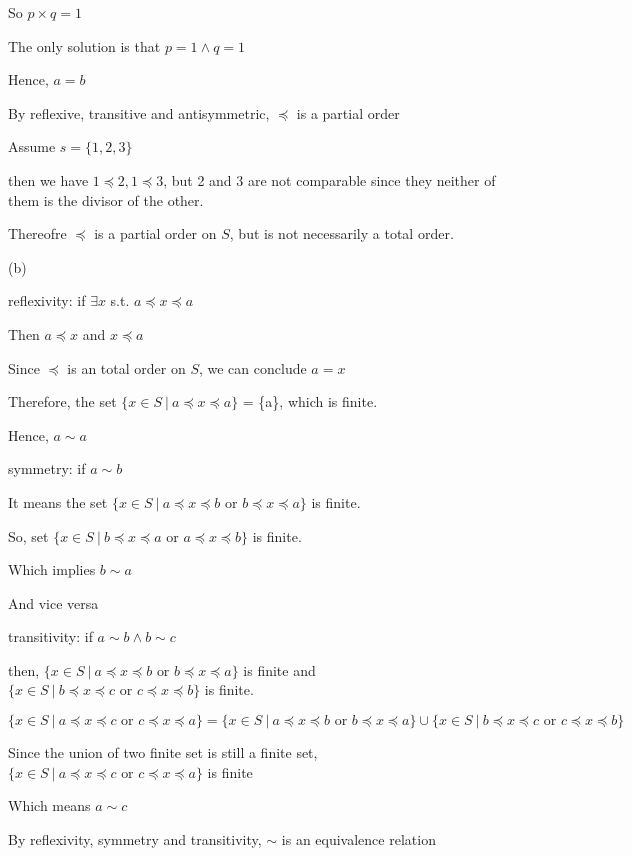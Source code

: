 \documentclass[11pt,twoside]{article}
\begin{document}
So $p\times q = 1$ 

The only solution is that $p=1 \land q = 1$ 

Hence, $a=b$

By reflexive, transitive and antisymmetric, $\preceq$ is a partial order

Assume $s = \{1,2,3\}$

then we have $1 \preceq 2, 1 \preceq 3$, but 2 and 3 are not comparable since they neither of them is the divisor of the other.


Thereofre $\preceq$ is a partial order on $S$, but is not necessarily a total order.

\hspace*{\fill}

(b)

reflexivity: if $\exists x$ s.t. $a\preceq x \preceq a$

Then $a\preceq x$ and $x\preceq a$

Since $\preceq$ is an total order on $S$, we can conclude $a= x$

Therefore, the set $\{x \in S\ |\ a \preceq x \preceq a\}$ = \{a\}, which is finite.

Hence, $a \sim a$

symmetry: if $a \sim b$

It means the set $\{x \in S\ |\ a \preceq x \preceq b \text{ or } b \preceq x \preceq a\}$ is finite.

So, set $\{x \in S\ |\ b \preceq x \preceq a \text{ or } a \preceq x \preceq b\}$ is finite.

Which implies $b \sim a$

And vice versa


transitivity: if $a\sim b \land b \sim c$

then, $\{x \in S\ |\ a \preceq x \preceq b \text{ or } b \preceq x \preceq a\}$ is finite and $\{x \in S\ |\ b \preceq x \preceq c \text{ or } c \preceq x \preceq b\}$ is finite.


$\{x \in S\ |\ a \preceq x \preceq c \text{ or } c \preceq x \preceq a\} = \{x \in S\ |\ a \preceq x \preceq b \text{ or } b \preceq x \preceq a\} \cup \{x \in S\ |\ b \preceq x \preceq c \text{ or } c \preceq x \preceq b\}$

Since the union of two finite set is still a finite set, $\{x \in S\ |\ a \preceq x \preceq c \text{ or } c \preceq x \preceq a\} $ is finite

Which means $a \sim c$

By reflexivity, symmetry and transitivity, $\sim$ is an equivalence relation
\end{document}
